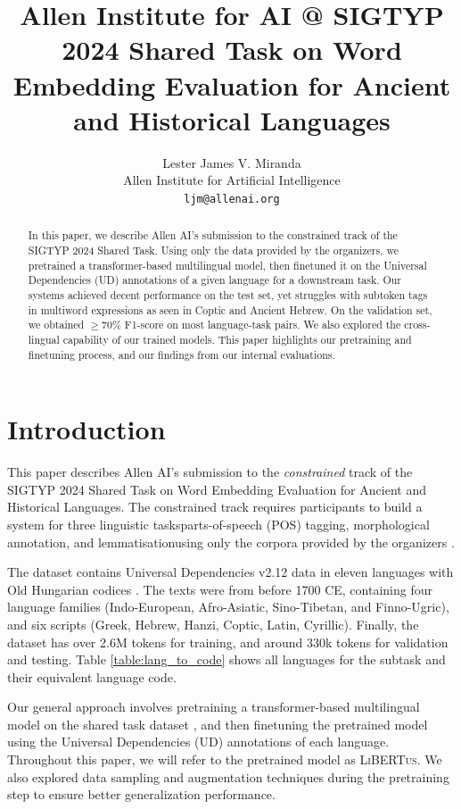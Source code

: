 \documentclass[11pt]{article}
\title{Allen Institute for AI @ SIGTYP 2024 Shared Task on Word Embedding Evaluation for Ancient and Historical Languages}
\author{Lester James V. Miranda \\
  Allen Institute for Artificial Intelligence \\
  \texttt{ljm@allenai.org} \\
}
\newcommand{\libertus}{\textsc{LiBERTus}}
\newcommand{\teamname}{Allen AI}
\begin{document}
\maketitle

\begin{abstract}
  In this paper, we describe \teamname{}'s submission to the constrained track of the SIGTYP 2024 Shared Task.
  Using only the data provided by the organizers, we pretrained a transformer-based multilingual model, then finetuned it on the Universal Dependencies (UD) annotations of a given language for a downstream task.
  Our systems achieved decent performance on the test set, yet struggles with subtoken tags in multiword expressions as seen in Coptic and Ancient Hebrew.
  On the validation set, we obtained $\geq$70\% F1-score on most language-task pairs.
  We also explored the cross-lingual capability of our trained models.
  This paper highlights our pretraining and finetuning process, and our findings from our internal evaluations.
\end{abstract}

\section{Introduction}
This paper describes \teamname{}'s submission to the \textit{constrained} track of the SIGTYP 2024 Shared Task on Word Embedding Evaluation for Ancient and Historical Languages.
The constrained track requires participants to build a system for three linguistic tasks\textemdash parts-of-speech (POS) tagging, morphological annotation, and lemmatisation\textemdash using only the corpora provided by the organizers \cite{dereza-etal-2024-findings}.



The dataset contains Universal Dependencies v2.12 data \cite{zeman-etal-2023-universal} in eleven languages with Old Hungarian codices \cite{has-2018-hungarian}.
The texts were from before 1700 CE, containing four language families (Indo-European, Afro-Asiatic, Sino-Tibetan, and Finno-Ugric), and six scripts (Greek, Hebrew, Hanzi, Coptic, Latin, Cyrillic).
Finally, the dataset has over 2.6M tokens for training, and around 330k tokens for validation and testing.
Table \ref{table:lang_to_code} shows all languages for the subtask and their equivalent language code.

Our general approach involves pretraining a transformer-based multilingual model on the shared task dataset \citep{dereza-etal-2024-findings}, and then finetuning the pretrained model using the Universal Dependencies (UD) annotations of each language.
Throughout this paper, we will refer to the pretrained model as \libertus{}.
We also explored data sampling and augmentation techniques during the pretraining step to ensure better generalization performance.
\end{document}
